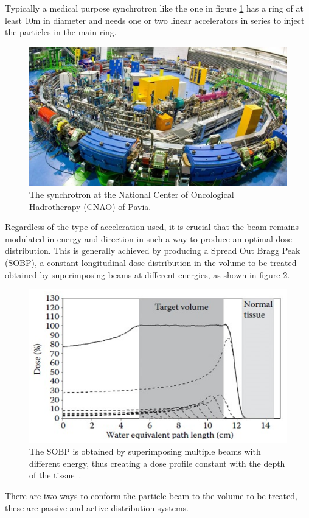 Typically a medical purpose synchrotron like the one in figure \ref{fig:sincrotrone} has a ring of at least 10m in diameter and needs one or two linear accelerators in series to inject the particles in the main ring.
\begin{figure}[H]
	\centering
	\includegraphics[width=0.7\linewidth]{IMG/ch1/Sincrotrone}
	\caption{The synchrotron at the National Center of Oncological Hadrotherapy (CNAO) of Pavia.}
	\label{fig:sincrotrone}
\end{figure}
\noindent Regardless of the type of acceleration used, it is crucial that the beam remains modulated in energy and direction in such a way to produce an optimal dose distribution. This is generally achieved by producing a Spread Out Bragg Peak (SOBP), a constant longitudinal dose distribution in the volume to be treated obtained by superimposing beams at different energies, as shown in figure \ref{fig:sobp}.
\begin{figure}[H]
	\centering
	\includegraphics[width=0.7\linewidth]{IMG/ch1/SOBP}
	\caption{The SOBP is obtained by superimposing multiple beams with different energy, thus creating a dose profile constant with the depth of the tissue~\cite{sobp}.}
	\label{fig:sobp}
\end{figure}
\noindent There are two ways to conform the particle beam to the volume to be treated, these are passive and active distribution systems.

